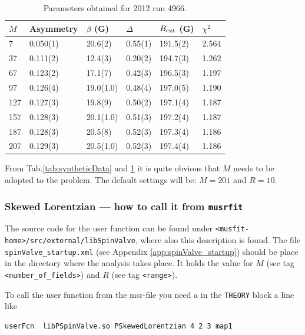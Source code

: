 \documentclass[twoside]{article}
\begin{document}
\begin{table}[h]
 \centering
 \begin{tabular}{l|l|l|l|l|l}
   $M$ & Asymmetry & $\beta$ (G) & $\Delta$   & $B_{\rm ext}$ (G) & $\chi^2$ \\ \hline\hline
    7  & 0.050(1)  & 20.6(2)     & 0.55(1)    & 191.5(2)          & 2.564 \\
   37  & 0.111(2)  & 12.4(3)     & 0.20(2)    & 194.7(3)          & 1.262 \\
   67  & 0.123(2)  & 17.1(7)     & 0.42(3)    & 196.5(3)          & 1.197 \\
   97  & 0.126(4)  & 19.0(1.0)   & 0.48(4)    & 197.0(5)          & 1.190 \\
  127  & 0.127(3)  & 19.8(9)     & 0.50(2)    & 197.1(4)          & 1.187 \\
  157  & 0.128(3)  & 20.1(1.0)   & 0.51(3)    & 197.2(4)          & 1.187 \\
  187  & 0.128(3)  & 20.5(8)     & 0.52(3)    & 197.3(4)          & 1.186 \\
  207  & 0.129(3)  & 20.5(1.0)   & 0.52(3)    & 197.4(4)          & 1.186
 \end{tabular}
 \caption{Parameters obtained for 2012 run 4966.}\label{tab:year2012run4966}
\end{table}

\noindent From Tab.\ref{tab:syntheticData} and \ref{tab:year2012run4966} it is quite obvious that $M$ needs to be adopted to the problem. 
The default settings will be: $M=201$ and $R=10$.

\subsubsection{Skewed Lorentzian --- how to call it from \texttt{musrfit}}\label{sec:skewedLorentzainAndMusrfit}

The source code for the user function can be found under \verb!<musfit-home>/src/external/libSpinValve!, where also this description is found.
The file \verb!spinValve_startup.xml! (see Appendix \ref{app:spinValve_startup}) should be place in the directory where the analysis takes place.
It holds the value for $M$ (see tag \verb!<number_of_fields>!) and $R$ (see tag \verb!<range>!).

To call the user function from the msr-file you need a in the \texttt{THEORY} block a line like

\begin{verbatim}
userFcn  libPSpinValve.so PSkewedLorentzian 4 2 3 map1 
\end{verbatim}
\end{document}
